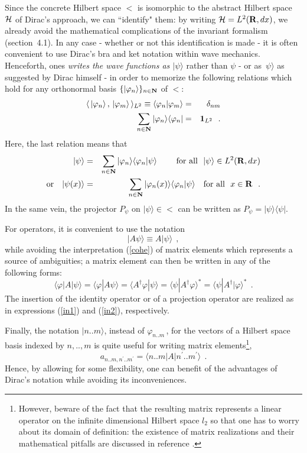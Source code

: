 \documentclass[a4wide,12pt]{report}
\begin{document}
Since the concrete Hilbert space $\lt$ is isomorphic to the 
abstract Hilbert space ${\cal H}$
of Dirac's approach, we can 
``identify" them: by writing  
${\cal H} = {L^2 ({{\bf R}},dx)}$, we already avoid the mathematical 
complications of the invariant formalism (section~4.1). 
In any case - whether or not this identification is made - 
it is often convenient to use Dirac's bra and ket notation 
within wave mechanics. Henceforth, ones 
{\em writes the wave functions as $| \psi \rangle$}
rather than $\psi$
- or as $\, \psi \rangle$ as suggested by Dirac 
himself \cite{d} 
- in order to memorize the following relations which hold for any
orthonormal basis 
$\{ | \varphi_n \rangle \}_{n\in {\bf N}}$ of $\lt$:
\begin{eqnarray*}
\langle \, |\varphi_n \rangle \, ,\, |\varphi_m \rangle \, \rangle _{L^2}
\equiv
\langle \varphi_n  | \varphi_m \rangle & = & \delta_{nm}
\\
\sum_{n \in {\bf N}}
| \varphi_n \rangle \langle \varphi_n | & = & {\bf 1}_{L^2}
\ \ .
\end{eqnarray*}
Here, the last relation means that 
\begin{eqnarray*}
|\psi \rangle & = &
\sum_{n \in {\bf N}}
| \varphi_n \rangle \langle \varphi_n | \psi \rangle
\qquad  \ \mbox{for all} \ \  | \psi \rangle \in {L^2 ({{\bf R}},dx)}
\\
\mbox{or} \quad
| \psi (x) \rangle & = &
\sum_{n \in {\bf N}}
| \varphi_n (x) \rangle \langle \varphi_n | \psi \rangle
\quad \mbox{for all} \ \  x \in {\bf R}
\ \ .
\end{eqnarray*}
In the same vein, the projector 
$P_{\psi}$ on 
$| \psi \rangle \in \lt$ 
can be written as 
$P_{\psi} = | \psi \rangle \langle \psi |$.
 
For operators, it is convenient to use the notation \cite{ct}
\[
| A \psi \rangle \equiv A | \psi \rangle
\ \ ,
\]
while avoiding the interpretation (\ref{cohe}) of matrix elements 
which represents a source of ambiguities; 
a matrix element can then be written 
in any of the following forms:
\[
\langle \varphi | A | \psi \rangle  =
\langle \varphi | A  \psi \rangle  =
\langle A^{\dag} \varphi | \psi \rangle =
\langle \psi | A^{\dag} \varphi \rangle ^{\ast} =
\langle \psi | A^{\dag} | \varphi \rangle ^{\ast}
\ \ .
\]
The insertion of the identity operator 
or of a projection operator 
are realized as in  
expressions (\ref{in1}) and (\ref{in2}), respectively.
 
Finally, the 
notation $|n..m \rangle$, instead of $\varphi_{n..m}\,$, for 
the vectors of a Hilbert space basis indexed by $n,..,m$
is quite useful for writing matrix elements\footnote{However, 
beware of the fact
that the resulting matrix represents a linear operator on the 
infinite dimensional Hilbert space $l_2$ so that 
one has to worry about its domain of definition:
the existence of matrix realizations and their mathematical pitfalls
are discussed in reference \cite{sg}.},  
\[
a_{n..m,n^{\prime} .. m^{\prime}} =
\langle n..m | A |
n^{\prime} .. m^{\prime} \rangle
\ \ .
\]
Hence, by allowing for some flexibility, 
one can benefit of the advantages of Dirac's notation 
while avoiding its inconveniences. 
\end{document}
